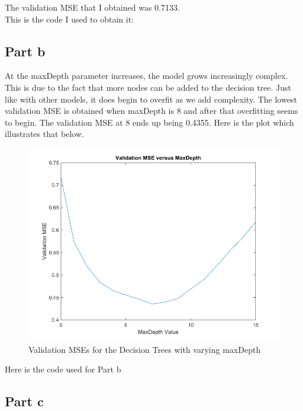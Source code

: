 \documentclass[twoside,11pt]{article}
\theoremstyle{definition}
\begin{document}
The validation MSE that I obtained was 0.7133. \\
This is the code I used to obtain it:


\newpage

\subsection*{Part b}

At the maxDepth parameter increases, the model grows increasingly complex. This is due to the fact that more nodes can be added to the decision tree. Just like with other models, it does begin to overfit as we add complexity. The lowest validation MSE is obtained when maxDepth is 8 and after that overfitting seems to begin. The validation MSE at 8 ends up being 0.4355. Here is the plot which illustrates that below.

\begin{figure}[h]
\centering
\includegraphics[width=6 in]{prob3plot1.png}
\caption{Validation MSEs for the Decision Trees with varying maxDepth}
\end{figure}

\newpage

Here is the code used for Part b\\


\newpage

\subsection*{Part c}
\end{document}
